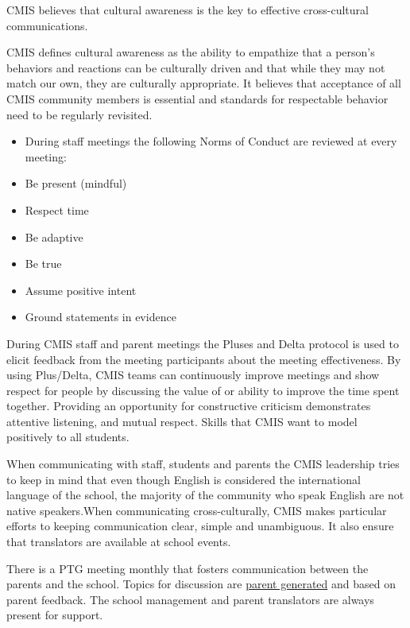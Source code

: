 
\begin{findings}
CMIS believes that cultural awareness is the key to effective cross-cultural communications. 

CMIS defines cultural awareness as the ability to empathize that a person's behaviors and reactions can be culturally driven and that while they may not match our own, they are culturally appropriate. It believes that acceptance of all CMIS community members is essential and standards for respectable behavior need to be regularly revisited. 


\begin{itemize}
\item During staff meetings the following Norms of Conduct are reviewed at every meeting:
\item Be present (mindful)
\item Respect time
\item Be adaptive
\item Be true
\item Assume positive intent
\item Ground statements in evidence
\end{itemize}

During CMIS staff and parent meetings the Pluses and Delta protocol is used to elicit feedback from the meeting participants about the meeting effectiveness. By using Plus/Delta, CMIS teams can continuously improve meetings and show respect for people by discussing the value of or ability to improve the time spent together. Providing an opportunity for constructive criticism demonstrates attentive listening, and mutual respect. Skills that CMIS want to model positively to all  students.

When communicating with staff, students and parents the CMIS leadership tries to keep in mind that even though English is considered the international language of the school, the majority of the community who speak English are not native speakers.When communicating cross-culturally, CMIS makes particular efforts to keeping communication clear, simple and unambiguous. It also ensure that translators are available at school events.


There is a PTG meeting monthly that fosters communication between the parents and the school. Topics for discussion are \href{https://docs.google.com/a/cmis.ac.th/document/d/1kiwakkg8eKdtEexCxVNx-m1CfC3VqxhukDy8WXDPGKY/edit?usp=sharing}{parent generated}  and based on parent feedback. The school management and parent translators are always present for support.


\end{findings}
